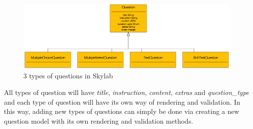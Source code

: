 \begin{figure}[h]
    \centering
    \includegraphics[width=\textwidth]{Images/Skylab_Questions.png}
    \caption{3 types of questions in Skylab}
\end{figure}

All types of question will have \textit{title}, \textit{instruction}, \textit{content}, \textit{extras} and \textit{question\_type} and each type of question will have its own way of rendering and validation. In this way, adding new types of questions can simply be done via creating a new question model with its own rendering and validation methods.
